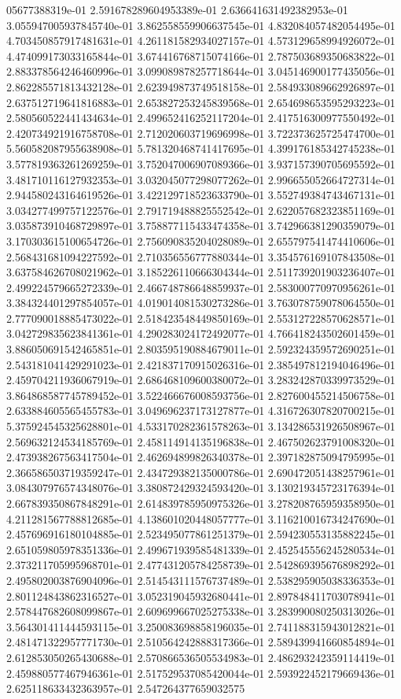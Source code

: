 05677388319e-01	2.591678289604953389e-01	2.636641631492382953e-01	3.055947005937845740e-01	3.862558559906637545e-01	4.832084057482054495e-01	4.703450857917481631e-01	4.261181582934027157e-01	4.573129658994926072e-01	4.474099173033165844e-01	3.674416768715074166e-01	2.787503689350683822e-01	2.883378564246460996e-01	3.099089878257718644e-01	3.045146900177435056e-01	2.862285571813432128e-01	2.623949873749518158e-01	2.584933089662926897e-01	2.637512719641816883e-01	2.653827253245839568e-01	2.654698653595293223e-01	2.580560522441434634e-01	2.499652416252117204e-01	2.417516300977550492e-01	2.420734921916758708e-01	2.712020603719696998e-01	3.722373625725474700e-01	5.560582087955638908e-01	5.781320468741417695e-01	4.399176185342745238e-01	3.577819363261269259e-01	3.752047006907089366e-01	3.937157390705695592e-01	3.481710116127932353e-01	3.032045077298077262e-01	2.996655052664727314e-01	2.944580243164619526e-01	3.422129718523633790e-01	3.552749384743467131e-01	3.034277499757122576e-01	2.791719488825552542e-01	2.622057682323851169e-01	3.035873910468729897e-01	3.758877115433474358e-01	3.742966381290359079e-01	3.170303615100654726e-01	2.756090835204028089e-01	2.655797541474410606e-01	2.568431681094227592e-01	2.710356556777880344e-01	3.354576169107843508e-01	3.637584626708021962e-01	3.185226110666304344e-01	2.511739201903236407e-01	2.499224579665272339e-01	2.466748786648859937e-01	2.583000770970956261e-01	3.384324401297854057e-01	4.019014081530273286e-01	3.763078759078064550e-01	2.777090018885473022e-01	2.518423548449850169e-01	2.553127228570628571e-01	3.042729835623841361e-01	4.290283024172492077e-01	4.766418243502601459e-01	3.886050691542465851e-01	2.803595190884679011e-01	2.592324359572690251e-01	2.543181041429291023e-01	2.421837170915026316e-01	2.385497812194046496e-01	2.459704211936067919e-01	2.686468109600380072e-01	3.283242870339973529e-01	3.864868587745789452e-01	3.522466676008593756e-01	2.827600455214506758e-01	2.633884605565455783e-01	3.049696237173127877e-01	4.316726307820700215e-01	5.375924545325628801e-01	4.533170282361578263e-01	3.134286531926508967e-01	2.569632124534185769e-01	2.458114914135196838e-01	2.467502623791008320e-01	2.473938267563417504e-01	2.462694899826340378e-01	2.397182875094795995e-01	2.366586503719359247e-01	2.434729382135000786e-01	2.690472051438257961e-01	3.084307976574348076e-01	3.380872429324593420e-01	3.130219345723176394e-01	2.667839350867848291e-01	2.614839785950975326e-01	3.278208765959358950e-01	4.211281567788812685e-01	4.138601020448057777e-01	3.116210016734247690e-01	2.457696916180104885e-01	2.523495077861251379e-01	2.594230553135882245e-01	2.651059805978351336e-01	2.499671939585481339e-01	2.452545556245280534e-01	2.373211705995968701e-01	2.477431205784258739e-01	2.542869395676898292e-01	2.495802003876904096e-01	2.514543111576737489e-01	2.538295905038336353e-01	2.801124843862316527e-01	3.052319045932680441e-01	2.897848411703078941e-01	2.578447682608099867e-01	2.609699667025275338e-01	3.283990080250313026e-01	3.564301411444593115e-01	3.250083698858196035e-01	2.741188315943012821e-01	2.481471322957771730e-01	2.510564242888317366e-01	2.589439941660854894e-01	2.612853050265430688e-01	2.570866536505534983e-01	2.486293242359114419e-01	2.459880577467946361e-01	2.517529537085420044e-01	2.593922452179669436e-01	2.625118633432363957e-01	2.547264377659032575